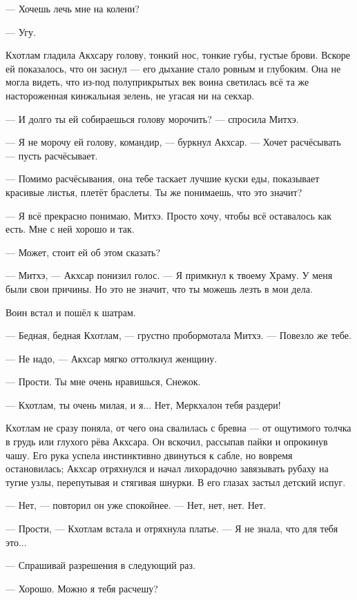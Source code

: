 --- Хочешь лечь мне на колени?

--- Угу.

Кхотлам гладила Акхсару голову, тонкий нос, тонкие губы, густые брови.
Вскоре ей показалось, что он заснул --- его дыхание стало ровным и глубоким.
Она не могла видеть, что из-под полуприкрытых век воина светилась всё та же настороженная кинжальная зелень, не угасая ни на секхар.

\asterism

--- И долго ты ей собираешься голову морочить? --- спросила Митхэ.

--- Я не морочу ей голову, командир, --- буркнул Акхсар.
--- Хочет расчёсывать --- пусть расчёсывает.

--- Помимо расчёсывания, она тебе таскает лучшие куски еды, показывает красивые листья, плетёт браслеты.
Ты же понимаешь, что это значит?

--- Я всё прекрасно понимаю, Митхэ.
Просто хочу, чтобы всё оставалось как есть.
Мне с ней хорошо и так.

--- Может, стоит ей об этом сказать?

--- Митхэ, --- Акхсар понизил голос.
--- Я примкнул к твоему Храму.
У меня были свои причины.
Но это не значит, что ты можешь лезть в мои дела.

Воин встал и пошёл к шатрам.

--- Бедная, бедная Кхотлам, --- грустно пробормотала Митхэ.
--- Повезло же тебе.

\asterism

--- Не надо, --- Акхсар мягко оттолкнул женщину.

--- Прости.
Ты мне очень нравишься, Снежок.

--- Кхотлам, ты очень милая, и я...
Нет, Меркхалон тебя раздери!

Кхотлам не сразу поняла, от чего она свалилась с бревна --- от ощутимого толчка в грудь или глухого рёва Акхсара.
Он вскочил, рассыпав пайки и опрокинув чашу.
Его рука успела инстинктивно двинуться к сабле, но вовремя остановилась;
Акхсар отряхнулся и начал лихорадочно завязывать рубаху на тугие узлы, перепутывая и стягивая шнурки.
В его глазах застыл детский испуг.

--- Нет, --- повторил он уже спокойнее.
--- Нет, нет, нет.
Нет.

--- Прости, --- Кхотлам встала и отряхнула платье.
--- Я не знала, что для тебя это...

--- Спрашивай разрешения в следующий раз.

--- Хорошо.
Можно я тебя расчешу?

